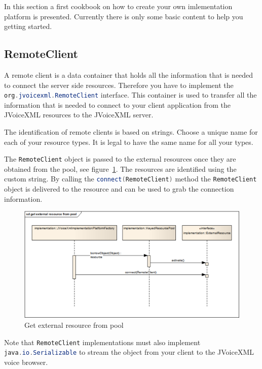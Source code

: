 \documentclass[11pt,a4paper]{article}
\begin{document}
In this section a first cookbook on how to create your own imlementation
platform is presented. Currently there is only some basic content to help you
getting started.


\subsection{RemoteClient}

A remote client is a data container that holds all the information that is
needed to connect the server side resources. Therefore you have to implement
the \lstinline[language=Java]{org.jvoicexml.RemoteClient} interface. This
container is used to transfer all the information that is needed to connect to
your client application from the JVoiceXML resources to the JVoiceXML server.

The identification of remote clients is based on strings. Choose a unique name
for each of your resource types. It is legal to have the same name for all your
types.

The \lstinline[language=Java]{RemoteClient} object is passed to the external
resources once they are obtained from the pool, see
figure~\ref{fig:get-external-resource-from-pool}. The resources are identified
using the custom string. By calling the
\lstinline[language=Java]{connect(RemoteClient)} method the
\lstinline[language=Java]{RemoteClient} object is delivered to the resource and
can be used to grab the connection information. \begin{figure}[htp]
\begin{center}
  \includegraphics[width=\linewidth]{sd-get-external-resource-from-pool}
  \caption{Get external resource from pool}
  \label{fig:get-external-resource-from-pool}
\end{center}
\end{figure}

Note that \lstinline[language=Java]{RemoteClient} implementations must also
implement \lstinline[language=Java]{java.io.Serializable} to stream the object
from your client to the JVoiceXML voice browser.
\end{document}

